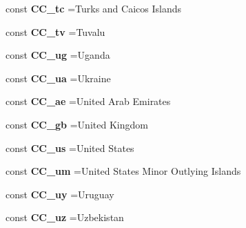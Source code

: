 \begin{DoxyCompactItemize}
\item 
\hypertarget{class_i_s_o_a2d9516d3de5b83774bbc3f56b09655bd}{}\label{class_i_s_o_a2d9516d3de5b83774bbc3f56b09655bd} 
const {\bfseries C\+C\+\_\+tc} =\textquotesingle{}Turks and Caicos Islands\textquotesingle{}
\item 
\hypertarget{class_i_s_o_a0857bc184b81fd823ee4ac74eb96c8ef}{}\label{class_i_s_o_a0857bc184b81fd823ee4ac74eb96c8ef} 
const {\bfseries C\+C\+\_\+tv} =\textquotesingle{}Tuvalu\textquotesingle{}
\item 
\hypertarget{class_i_s_o_ab2e896df34c5f24681c62d75ecf780ea}{}\label{class_i_s_o_ab2e896df34c5f24681c62d75ecf780ea} 
const {\bfseries C\+C\+\_\+ug} =\textquotesingle{}Uganda\textquotesingle{}
\item 
\hypertarget{class_i_s_o_a95eb8c4d6f263c7c7e9fd8710ba1600a}{}\label{class_i_s_o_a95eb8c4d6f263c7c7e9fd8710ba1600a} 
const {\bfseries C\+C\+\_\+ua} =\textquotesingle{}Ukraine\textquotesingle{}
\item 
\hypertarget{class_i_s_o_afebb578d0c72fe06b4d6644f20cef501}{}\label{class_i_s_o_afebb578d0c72fe06b4d6644f20cef501} 
const {\bfseries C\+C\+\_\+ae} =\textquotesingle{}United Arab Emirates\textquotesingle{}
\item 
\hypertarget{class_i_s_o_afd0424edc170ddff58689ae89c0e547a}{}\label{class_i_s_o_afd0424edc170ddff58689ae89c0e547a} 
const {\bfseries C\+C\+\_\+gb} =\textquotesingle{}United Kingdom\textquotesingle{}
\item 
\hypertarget{class_i_s_o_a09a7725847a09fc20595e8a833467dfd}{}\label{class_i_s_o_a09a7725847a09fc20595e8a833467dfd} 
const {\bfseries C\+C\+\_\+us} =\textquotesingle{}United States\textquotesingle{}
\item 
\hypertarget{class_i_s_o_a2c414806383b222c71794bbacd4dc5a4}{}\label{class_i_s_o_a2c414806383b222c71794bbacd4dc5a4} 
const {\bfseries C\+C\+\_\+um} =\textquotesingle{}United States Minor Outlying Islands\textquotesingle{}
\item 
\hypertarget{class_i_s_o_acaf04fabb27e67325e65581906682c23}{}\label{class_i_s_o_acaf04fabb27e67325e65581906682c23} 
const {\bfseries C\+C\+\_\+uy} =\textquotesingle{}Uruguay\textquotesingle{}
\item 
\hypertarget{class_i_s_o_a775271c9c362820c6d997327f91acff2}{}\label{class_i_s_o_a775271c9c362820c6d997327f91acff2} 
const {\bfseries C\+C\+\_\+uz} =\textquotesingle{}Uzbekistan\textquotesingle{}
\item 
\hypertarget{class_i_s_o_aea92253ac408a35755466148faae3b88}{}\label{class_i_s_o_aea92253ac408a35755466148faae3b88} 

\end{DoxyCompactItemize}
